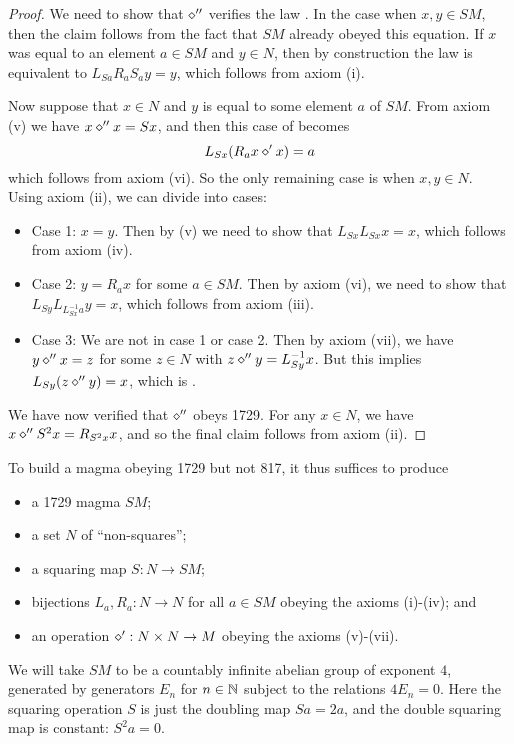 \begin{proof}  We need to show that $\diamond''$ verifies the law .  In the case when $x,y \in SM$, then the claim follows from the fact that $SM$ already obeyed this equation.  If $x$ was equal to an element $a \in SM$ and $y \in N$, then by construction the law is equivalent to $L_{Sa} R_a S_a y = y$, which follows from axiom (i).

Now suppose that $x \in N$ and $y$ is equal to some element $a$ of $SM$.  From axiom (v) we have $x \diamond'' x = Sx$, and then this case of  becomes
$$L_{Sx} ( R_a x \diamond' x ) = a$$
which follows from axiom (vi).  So the only remaining case is when $x,y \in N$.  Using axiom (ii), we can divide into cases:
\begin{itemize}
\item Case 1: $x=y$.  Then by (v) we need to show that $L_{Sx} L_{Sx} x = x$, which follows from axiom (iv).
\item Case 2: $y = R_a x$ for some $a \in SM$.  Then by axiom (vi), we need to show that $L_{Sy} L_{L_{Sx}^{-1} a} y = x$, which follows from axiom (iii).
\item Case 3: We are not in case 1 or case 2.  Then by axiom (vii), we have $y \diamond'' x = z$ for some $z \in N$ with $z \diamond'' y = L_{Sy}^{-1} x$.  But this implies $L_{Sy} (z \diamond'' y) = x$, which is .
\end{itemize}

We have now verified that $\diamond''$ obeys 1729.  For any $x \in N$, we have $x \diamond'' S^2 x = R_{S^2 x} x$, and so the final claim follows from axiom (ii).
\end{proof}

To build a magma obeying 1729 but not 817, it thus suffices to produce
\begin{itemize}
  \item a 1729 magma $SM$;
  \item a set $N$ of ``non-squares'';
  \item a squaring map $S: N \to SM$;
  \item bijections $L_a, R_a: N \to N$ for all $a \in SM$ obeying the axioms (i)-(iv); and
  \item an operation $\diamond': N \times N \to M$ obeying the axioms (v)-(vii).
\end{itemize}

We will take $SM$ to be a countably infinite abelian group of exponent $4$, generated by generators $E_n$ for $n \in \mathbb{N}$ subject to the relations $4E_n=0$.   Here the squaring operation $S$ is just the doubling map $Sa = 2a$, and the double squaring map is constant: $S^2 a = 0$.

